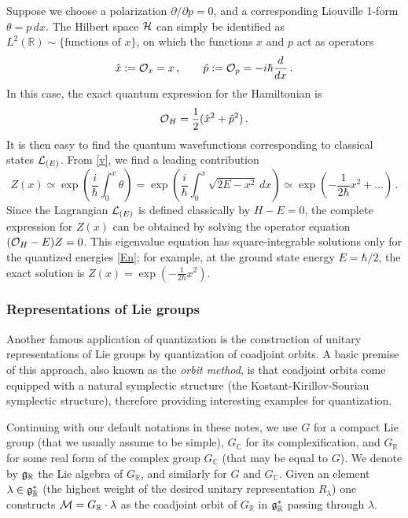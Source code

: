 \documentclass[letterpaper,12pt]{article}
\numberwithin{equation}{section}
\newcommand{\be}{\begin{equation}}
\newcommand{\ee}{\end{equation}}
\newcommand{\pd}{\partial}
\newcommand{\R}{{\mathbb{R}}}
\newcommand{\C}{{\mathbb{C}}}
\newcommand{\fg}{{\frak{g}}}
\newcommand{\CH}{{\cal H}}
\newcommand{\CL}{{\cal L}}
\newcommand{\CM}{{\cal M}}
\newcommand{\CO}{{\cal O}}
\renewcommand{\=}{\;=\;}
\begin{document}
Suppose we choose a polarization $\pd/\pd p=0$, and a corresponding Liouville 1-form $\theta = p\,dx$. The Hilbert space $\CH$ can simply be identified as $L^2(\R) \sim \{\text{functions of $x$}\}$, on which the functions $x$ and $p$ act as operators
%
\be \hat{x}:=\CO_x = x\,, \qquad \hat{p}:=\CO_p = -i\hbar\frac{d}{dx}\,. \ee
%
In this case, the exact quantum expression for the Hamiltonian is
%
\be \CO_H = \frac12(\hat{x}^2+\hat{p}^2)\,. \ee
%
It is then easy to find the quantum wavefunctions corresponding to classical states $\CL_{(E)}$. From \eqref{v}, we find a leading contribution
%
\be Z(x) \simeq \exp\left(\frac{i}{\hbar}\int_0^x \theta\right) = \exp\left(\frac{i}{\hbar}\int_0^x\sqrt{2E-x^2}\,dx\right)
 \simeq \exp\left(-\frac{1}{2\hbar}x^2+ \ldots\right)\,.
\ee
%
Since the Lagrangian $\CL_{(E)}$ is defined classically by $H-E=0$,
the complete expression for $Z(x)$ can be obtained by solving the operator equation $(\CO_H-E)Z=0$.
This eigenvalue equation has square-integrable solutions only for the quantized energies \eqref{En};
for example, at the ground state energy $E = \hbar/2$,
the exact solution is $Z(x) = \exp\left(-\frac{1}{2\hbar}x^2\right)$.


\subsubsection*{Representations of Lie groups}

Another famous application of quantization
is the construction of unitary representations of Lie groups by quantization of coadjoint orbits.
A basic premise of this approach, also known as the {\em orbit method},
is that coadjoint orbits come equipped with a natural symplectic structure
(the Kostant-Kirillov-Souriau symplectic structure), therefore
providing interesting examples for quantization.

Continuing with our default notations in these notes,
we use $G$ for a compact Lie group (that we usually assume to be simple),
$G_{\C}$ for its complexification,
and $G_{\R}$ for some real form of the complex group $G_{\C}$ (that may be equal to $G$).
We denote by $\fg_{\R}$ the Lie algebra of $G_{\R}$, and similarly for $G$ and $G_{\C}$.
Given an element $\lambda \in \fg_{\R}^*$ (the highest weight of the desired unitary representation $R_\lambda$)
one constructs $\CM = G_{\R} \cdot \lambda$
as the coadjoint orbit of $G_{\R}$ in $\fg_{\R}^*$ passing through $\lambda$.
\end{document}
